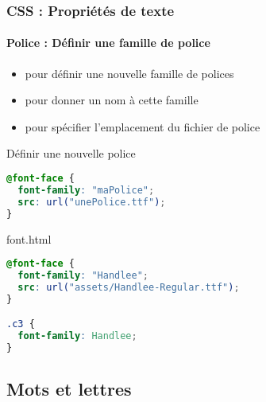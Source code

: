 \documentclass[xcolor=table]{beamer}
\begin{document}
\begin{frame}[fragile]
\frametitle{CSS : Propriétés de texte}
\framesubtitle{Police : Définir une famille de police}

\begin{minipage}{0.50\textwidth}
	\begin{itemize}
		\item {}  pour définir une nouvelle famille de polices
		\item {} pour donner un nom à cette famille
		\item {} pour spécifier l'emplacement du fichier de police
	\end{itemize}
\end{minipage}
%
\begin{minipage}{0.49\textwidth}
\begin{block}{Définir une nouvelle police}
\lstset{escapeinside=**}
\scriptsize\bfseries
\begin{lstlisting}[language={CSS}]
@font-face {
  font-family: "maPolice";
  src: url("unePolice.ttf");
}
\end{lstlisting}
\end{block}
\begin{exampleblock}{font.html}
\lstset{escapeinside=**}
\tiny\bfseries
\begin{lstlisting}[language={CSS}]
@font-face {
  font-family: "Handlee";
  src: url("assets/Handlee-Regular.ttf");
}

.c3 {
  font-family: Handlee;
}
\end{lstlisting}
\end{exampleblock}
\end{minipage}
\end{frame}

\subsection{Mots et lettres}
\end{document}
